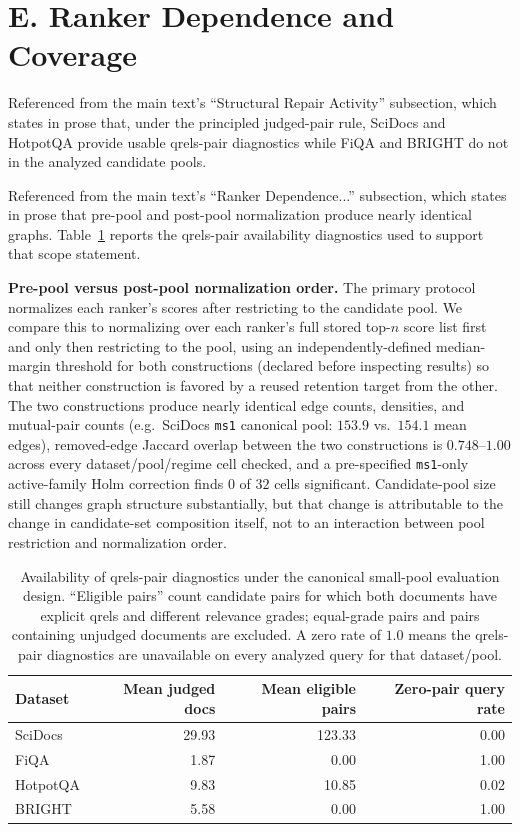 \documentclass[manuscript,anonymous,review]{acmart}
\begin{document}
\section{E. Ranker Dependence and Coverage}
\label{sec:supp-ranker-dep}

Referenced from the main text's ``Structural Repair Activity'' subsection,
which states in prose that, under the principled judged-pair rule, SciDocs
and HotpotQA provide usable qrels-pair diagnostics while FiQA and BRIGHT do
not in the analyzed candidate pools.

Referenced from the main text's ``Ranker Dependence...'' subsection, which
states in prose that pre-pool and post-pool normalization produce nearly
identical graphs.
Table~\ref{tab:supp-bew-pic} reports the qrels-pair availability diagnostics
used to support that scope statement.

\textbf{Pre-pool versus post-pool normalization order.} The primary
protocol normalizes each ranker's scores after restricting to the candidate
pool. We compare this to normalizing over each ranker's full stored
top-$n$ score list first and only then restricting to the pool, using an
independently-defined median-margin threshold for both constructions
(declared before inspecting results) so that neither construction is
favored by a reused retention target from the other. The two constructions
produce nearly identical edge counts, densities, and mutual-pair counts
(e.g.\ SciDocs \texttt{ms1} canonical pool: $153.9$ vs.\ $154.1$ mean
edges), removed-edge Jaccard overlap between the two constructions is
$0.748$--$1.00$ across every dataset/pool/regime cell checked, and a
pre-specified \texttt{ms1}-only active-family Holm correction finds $0$ of
$32$ cells significant. Candidate-pool size still changes graph structure
substantially, but that change is attributable to the change in
candidate-set composition itself, not to an interaction between pool
restriction and normalization order.

\begin{table}[h]
  \caption{Availability of qrels-pair diagnostics under the canonical
    small-pool evaluation design. ``Eligible pairs'' count candidate pairs for
    which both documents have explicit qrels and different relevance grades;
    equal-grade pairs and pairs containing unjudged documents are excluded. A
    zero rate of $1.0$ means the qrels-pair diagnostics are unavailable on
    every analyzed query for that dataset/pool.}
  \label{tab:supp-bew-pic}
  \begin{tabular}{lrrr}
    \toprule
    Dataset & Mean judged docs & Mean eligible pairs & Zero-pair query rate \\
    \midrule
    SciDocs  & 29.93 & 123.33 & 0.00 \\
    FiQA     & 1.87  & 0.00   & 1.00 \\
    HotpotQA & 9.83  & 10.85  & 0.02 \\
    BRIGHT   & 5.58  & 0.00   & 1.00 \\
    \bottomrule
  \end{tabular}
\end{table}
\end{document}
